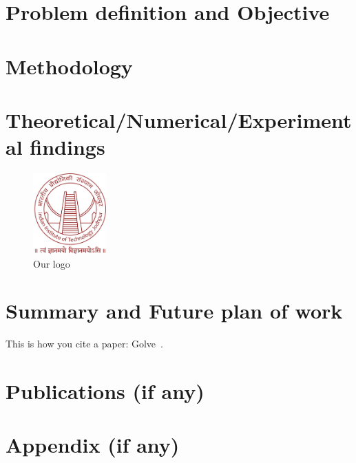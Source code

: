            

\section{Problem definition and Objective}
\clearpage

\section{Methodology}
\clearpage
\section{Theoretical/Numerical/Experimental findings}
\begin{figure}[h]
    \centering
    \includegraphics[width=0.25\textwidth]{Figures/IITJlogo.jpg}
    \caption{\label{fig:myfig1}Our logo}
    
\end{figure}
\clearpage
\section{Summary and Future plan of work}
This is how you cite a paper: Golve~\cite{glove:2014}.
\myemptypage
\section*{Publications  (if any)}
\myemptypage
\section*{Appendix (if any)}
